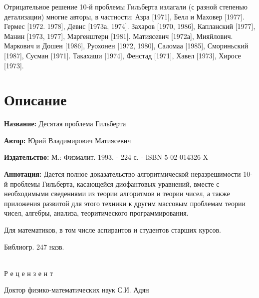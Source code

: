 \documentclass[12pt, a4paper, openany]{book}
\begin{document}
Отрицательное решение 10-й проблемы Гильберта излагали (с разной степенью детализации) многие авторы, в частности: Азра [1971], Белл и Маховер [1977]. Гермес [1972. 1978], Девис [1973а, 1974]. Захаров [1970, 1986], Капланский [1977], Манин [1973, 1977], Маргенштерн [1981]. Матиясевич [1972а], Мияйлович. Маркович и Дошен [1986], Руохонен [1972, 1980], Саломаа [1985], Смориньский [1987], Сусман [1971]. Такахаши [1974], Фенстад [1971], Хавел [1973], Хиросе [1973]. 



	
	
	\newpage
	\tableofcontents
	
	\thispagestyle{empty} %
	
	\newpage
	
	\setcounter{secnumdepth}{0}
	
	
		\section*{Описание}
	
	{\bf Название:} Десятая проблема Гильберта
	
{\bf Автор:} Юрий Владимирович Матиясевич
	
{\bf Издательство:} М.: Физмалит. 1993. - 224 с. - ISBN 5-02-014326-X
	
		{\bf Аннотация:} Дается полное доказательство алгоритмической неразрешимости 10-й проблемы Гильберта, касающейся диофантовых уравнений, вместе с необходимыми сведениями из теории алгоритмов и теории чисел, а также приложения развитой для этого техники к другим массовым проблемам теории чисел, алгебры, анализа, теоритического программирования.
		
		Для математиков, в том числе аспирантов и студентов старших курсов.
		
		Библиогр. 247 назв.
		
\ \\

		Р е ц е н з е н т
		
		Доктор физико-математических наук С.И. Адян
		\thispagestyle{empty} %

	
\end{document}
